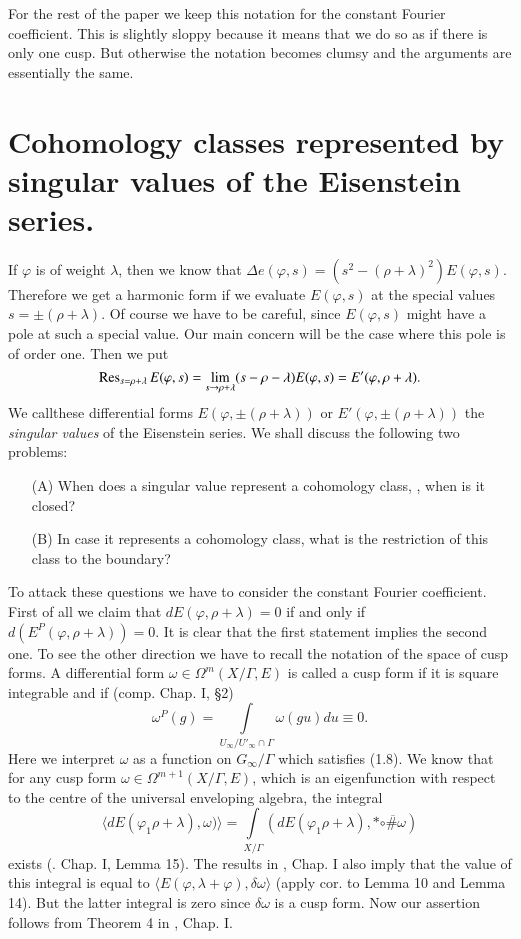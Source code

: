For the rest of the paper we keep this notation for the constant Fourier coefficient. This is slightly sloppy because it means that we do so as if there is only one cusp. But otherwise the notation becomes clumsy and the arguments are essentially the same.

\section{Cohomology classes represented by singular values of the Eisenstein series.}\label{art5-sec4}
If $\varphi$ is of weight $\lambda$, then we know that $\Delta e(\varphi, s) = (s^2 - (\rho + \lambda)^2) E (\varphi, s)$. Therefore we get a harmonic form if we evaluate $E(\varphi,s)$ at the special values $s = \pm (\rho + \lambda)$. Of course we have to be careful, since $E(\varphi, s)$ might have a pole at such a special value. Our main concern will be the case where this pole is of order one. Then we put
$$
\operatorname{Res}_{s = \rho + \lambda} E(\varphi, s) = \lim\limits_{s \to \rho + \lambda} (s - \rho - \lambda) E (\varphi, s) = E' (\varphi, \rho + \lambda).
$$
We call\pageoriginale these differential forms $E (\varphi , \pm  (\rho +\lambda))$ or $E' (\varphi, \pm (\rho + \lambda))$ the \textit{singular values} of the Eisenstein series. We shall discuss the following two problems:
\begin{itemize}
\item[(A)] When does a singular value represent a cohomology class, \ie, when is it closed?

\item[(B)] In case it represents a cohomology class, what is the restriction of this class to the boundary?
\end{itemize}
To attack these questions we have to consider the constant Fourier coefficient. First of all we claim that $d E (\varphi, \rho+\lambda) = 0$ if and only if $d (E^P (\varphi, \rho + \lambda)) =0$. It is clear that the first statement implies the second one. To see the other direction we have to recall the notation of the space of cusp forms. A differential form $\omega\in \Omega^m (X/\Gamma, E)$ is called a cusp form if it is square integrable and if (comp. \cite{art5-key8} Chap. I, \S 2)
$$
\omega^P (g) = \int\limits_{U_\infty/ U'_\infty \cap \Gamma} \omega (gu) du \equiv 0.
$$
Here we interpret $\omega$ as a function on $G_\infty / \Gamma$ which satisfies (1.8). We know that for any cusp form $\omega \in \Omega^{m+1} (X/ \Gamma, E)$, which is an eigenfunction with respect to the centre of the universal enveloping algebra, the integral
$$
\langle dE (\varphi_1 \rho + \lambda),\omega)\rangle = \int\limits_{X/\Gamma} (dE (\varphi_1 \rho + \lambda), \ast \overline{\circ \# \omega})
$$
exists (\cite{art5-key8}. Chap. I, Lemma 15). The results in \cite{art5-key8}, Chap. I also imply that the value of this integral is equal to $\langle E(\varphi, \lambda + \varphi), \delta \omega \rangle$ (apply cor. to Lemma 10 and Lemma 14). But the latter integral is zero since $\delta \omega$ is a cusp form. Now our assertion follows from Theorem 4 in \cite{art5-key8}, Chap. I.

